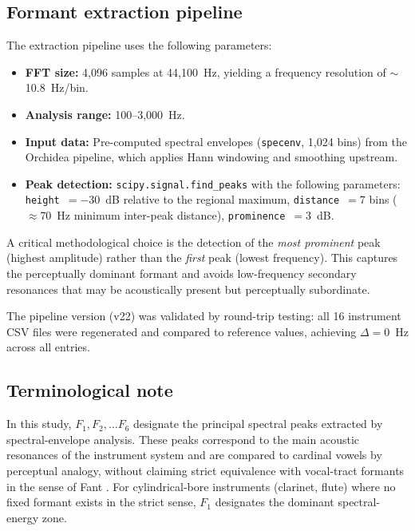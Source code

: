 \documentclass[12pt,a4paper]{article}
\begin{document}
\subsection{Formant extraction pipeline}

The extraction pipeline uses the following parameters:

\begin{itemize}
\item \textbf{FFT size:} 4,096 samples at 44,100~Hz, yielding a frequency resolution
of $\sim$10.8~Hz/bin.
\item \textbf{Analysis range:} 100--3,000~Hz.
\item \textbf{Input data:} Pre-computed spectral envelopes (\texttt{specenv}, 1,024
bins) from the Orchidea pipeline, which applies Hann windowing and smoothing
upstream.
\item \textbf{Peak detection:} \texttt{scipy.signal.find\_peaks} with the following
parameters: \texttt{height}~$= -30$~dB relative to the regional maximum,
\texttt{distance}~$= 7$ bins ($\approx$70~Hz minimum inter-peak distance),
\texttt{prominence}~$= 3$~dB.
\end{itemize}

A critical methodological choice is the detection of the \emph{most prominent}
peak (highest amplitude) rather than the \emph{first} peak (lowest frequency).
This captures the perceptually dominant formant and avoids low-frequency
secondary resonances that may be acoustically present but perceptually
subordinate.

The pipeline version (v22) was validated by round-trip testing: all 16 instrument
CSV files were regenerated and compared to reference values, achieving
$\Delta = 0$~Hz across all entries.

\subsection{Terminological note}

In this study, $F_1, F_2, \ldots F_6$ designate the principal spectral peaks
extracted by spectral-envelope analysis. These peaks correspond to the main
acoustic resonances of the instrument system and are compared to cardinal vowels
by perceptual analogy, without claiming strict equivalence with vocal-tract
formants in the sense of Fant \citep{Fant1960}. For cylindrical-bore instruments
(clarinet, flute) where no fixed formant exists in the strict sense, $F_1$
designates the dominant spectral-energy zone.
\end{document}
